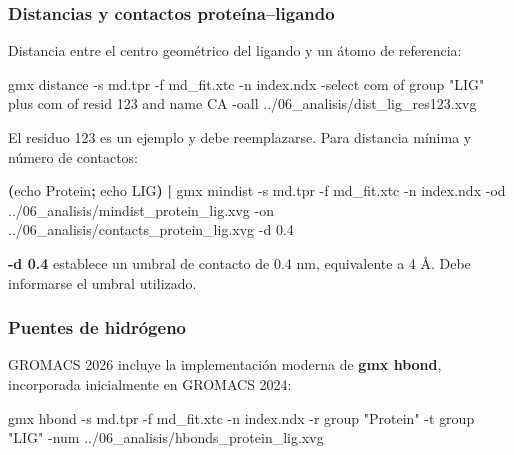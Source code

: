 \documentclass[
  spanish,
  11pt,
  a4paper]{article}
\newenvironment{Shaded}{\begin{snugshade}}{\end{snugshade}}
\newcommand{\AttributeTok}[1]{\textcolor[rgb]{0.13,0.29,0.53}{#1}}
\newcommand{\BuiltInTok}[1]{#1}
\newcommand{\ExtensionTok}[1]{#1}
\newcommand{\KeywordTok}[1]{\textcolor[rgb]{0.13,0.29,0.53}{\textbf{#1}}}
\newcommand{\NormalTok}[1]{#1}
\newcommand{\StringTok}[1]{\textcolor[rgb]{0.31,0.60,0.02}{#1}}
\begin{document}
\subsubsection{Distancias y contactos
proteína--ligando}\label{distancias-y-contactos-proteuxednaligando}

Distancia entre el centro geométrico del ligando y un átomo de
referencia:

\begin{Shaded}
\begin{Highlighting}[]
\ExtensionTok{gmx}\NormalTok{ distance     }\AttributeTok{{-}s}\NormalTok{ md.tpr     }\AttributeTok{{-}f}\NormalTok{ md\_fit.xtc     }\AttributeTok{{-}n}\NormalTok{ index.ndx     }\AttributeTok{{-}select} \StringTok{\textquotesingle{}com of group "LIG" plus com of resid 123 and name CA\textquotesingle{}}     \AttributeTok{{-}oall}\NormalTok{ ../06\_analisis/dist\_lig\_res123.xvg}
\end{Highlighting}
\end{Shaded}

El residuo 123 es un ejemplo y debe reemplazarse. Para distancia mínima
y número de contactos:

\begin{Shaded}
\begin{Highlighting}[]
\KeywordTok{(}\BuiltInTok{echo}\NormalTok{ Protein}\KeywordTok{;} \BuiltInTok{echo}\NormalTok{ LIG}\KeywordTok{)} \KeywordTok{|}
\ExtensionTok{gmx}\NormalTok{ mindist     }\AttributeTok{{-}s}\NormalTok{ md.tpr     }\AttributeTok{{-}f}\NormalTok{ md\_fit.xtc     }\AttributeTok{{-}n}\NormalTok{ index.ndx     }\AttributeTok{{-}od}\NormalTok{ ../06\_analisis/mindist\_protein\_lig.xvg     }\AttributeTok{{-}on}\NormalTok{ ../06\_analisis/contacts\_protein\_lig.xvg     }\AttributeTok{{-}d}\NormalTok{ 0.4}
\end{Highlighting}
\end{Shaded}

\textbf{-d 0.4} establece un umbral de contacto de 0.4 nm, equivalente a
4 Å. Debe informarse el umbral utilizado.

\subsubsection{Puentes de hidrógeno}\label{puentes-de-hidruxf3geno}

GROMACS 2026 incluye la implementación moderna de \textbf{gmx hbond},
incorporada inicialmente en GROMACS 2024:

\begin{Shaded}
\begin{Highlighting}[]
\ExtensionTok{gmx}\NormalTok{ hbond     }\AttributeTok{{-}s}\NormalTok{ md.tpr     }\AttributeTok{{-}f}\NormalTok{ md\_fit.xtc     }\AttributeTok{{-}n}\NormalTok{ index.ndx     }\AttributeTok{{-}r} \StringTok{\textquotesingle{}group "Protein"\textquotesingle{}}     \AttributeTok{{-}t} \StringTok{\textquotesingle{}group "LIG"\textquotesingle{}}     \AttributeTok{{-}num}\NormalTok{ ../06\_analisis/hbonds\_protein\_lig.xvg}
\end{Highlighting}
\end{Shaded}
\end{document}
